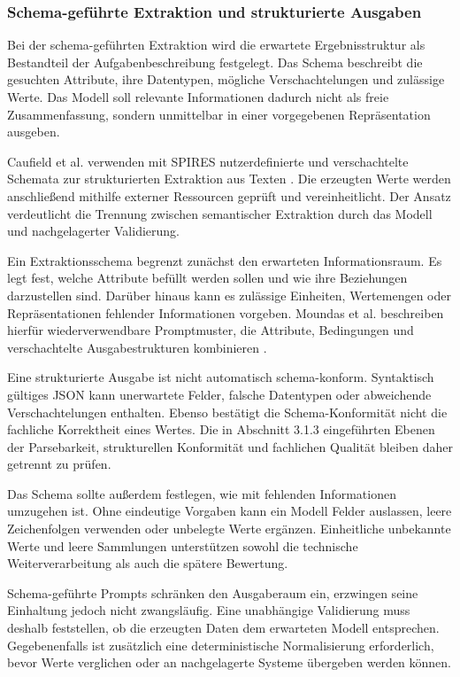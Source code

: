 \subsubsection{Schema-geführte Extraktion und strukturierte Ausgaben}

Bei der schema-geführten Extraktion wird die erwartete Ergebnisstruktur als Bestandteil der Aufgabenbeschreibung festgelegt. Das Schema beschreibt die gesuchten Attribute, 
ihre Datentypen, mögliche Verschachtelungen und zulässige Werte. Das Modell soll relevante Informationen dadurch nicht als freie Zusammenfassung, sondern unmittelbar in 
einer vorgegebenen Repräsentation ausgeben.

Caufield et al. verwenden mit SPIRES nutzerdefinierte und verschachtelte Schemata zur strukturierten Extraktion aus Texten \cite{caufield2024spires}. Die erzeugten Werte 
werden anschließend mithilfe externer Ressourcen geprüft und vereinheitlicht. Der Ansatz verdeutlicht die Trennung zwischen semantischer Extraktion durch das Modell und 
nachgelagerter Validierung.

Ein Extraktionsschema begrenzt zunächst den erwarteten Informationsraum. Es legt fest, welche Attribute befüllt werden sollen und wie ihre Beziehungen darzustellen sind. 
Darüber hinaus kann es zulässige Einheiten, Wertemengen oder Repräsentationen fehlender Informationen vorgeben. Moundas et al. beschreiben hierfür wiederverwendbare Promptmuster, 
die Attribute, Bedingungen und verschachtelte Ausgabestrukturen kombinieren \cite{moundas2025promptpatterns}.

Eine strukturierte Ausgabe ist nicht automatisch schema-konform. Syntaktisch gültiges JSON kann unerwartete Felder, falsche Datentypen oder abweichende Verschachtelungen 
enthalten. Ebenso bestätigt die Schema-Konformität nicht die fachliche Korrektheit eines Wertes. Die in Abschnitt 3.1.3 eingeführten Ebenen der Parsebarkeit, strukturellen 
Konformität und fachlichen Qualität bleiben daher getrennt zu prüfen.

Das Schema sollte außerdem festlegen, wie mit fehlenden Informationen umzugehen ist. Ohne eindeutige Vorgaben kann ein Modell Felder auslassen, leere Zeichenfolgen verwenden 
oder unbelegte Werte ergänzen. Einheitliche unbekannte Werte und leere Sammlungen unterstützen sowohl die technische Weiterverarbeitung als auch die spätere Bewertung.

Schema-geführte Prompts schränken den Ausgaberaum ein, erzwingen seine Einhaltung jedoch nicht zwangsläufig. Eine unabhängige Validierung muss deshalb feststellen, ob die 
erzeugten Daten dem erwarteten Modell entsprechen. Gegebenenfalls ist zusätzlich eine deterministische Normalisierung erforderlich, bevor Werte verglichen oder an nachgelagerte 
Systeme übergeben werden können.

